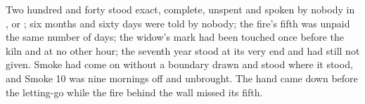 Two hundred and forty stood exact, complete, unspent and spoken by nobody in ,  or ; six months and sixty days were told by nobody; the fire's fifth was unpaid the same number of days; the widow's mark had been touched once before the kiln and at no other hour; the seventh year stood at its very end and had still not given. Smoke had come on without a boundary drawn and stood where it stood, and Smoke 10 was nine mornings off and unbrought. The hand came down before the letting-go while the fire behind the wall missed its fifth.
